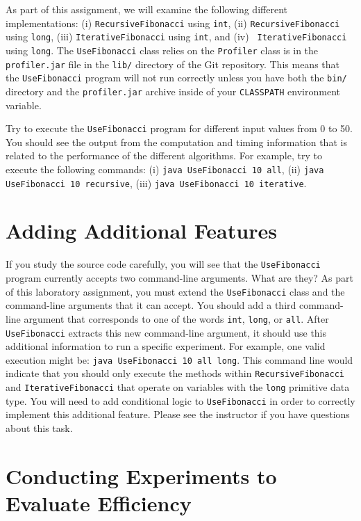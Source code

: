 \begin{sloppypar}
As part of this assignment, we will examine the following different implementations: (i) {\tt RecursiveFibonacci} using
{\tt int}, (ii) {\tt RecursiveFibonacci} using {\tt long}, (iii) {\tt IterativeFibonacci} using {\tt int}, and (iv) {\tt
  IterativeFibonacci} using {\tt long}. The {\tt UseFibonacci} class relies on the {\tt Profiler} class is in the {\tt
  profiler.jar} file in the {\tt lib/} directory of the Git repository.  This means that the {\tt UseFibonacci} program
will not run correctly unless you have both the {\tt bin/} directory and the {\tt profiler.jar} archive inside of your
{\tt CLASSPATH} environment variable.
\end{sloppypar}

Try to execute the {\tt UseFibonacci} program for different input values from 0 to 50. You should see the output from
the computation and timing information that is related to the performance of the different algorithms. For example, try
to execute the following commands: (i) {\tt java UseFibonacci 10 all}, (ii) {\tt java UseFibonacci 10 recursive}, (iii)
{\tt java UseFibonacci 10 iterative}. 

\section*{Adding Additional Features}

If you study the source code carefully, you will see that the {\tt UseFibonacci} program currently accepts two
command-line arguments. What are they? As part of this laboratory assignment, you must extend the {\tt UseFibonacci}
class and the command-line arguments that it can accept. You should add a third command-line argument that corresponds
to one of the words {\tt int}, {\tt long}, or {\tt all}. After {\tt UseFibonacci} extracts this new command-line
argument, it should use this additional information to run a specific experiment. For example, one valid execution might
be: {\tt java UseFibonacci 10 all long}. This command line would indicate that you should only execute the methods
within {\tt RecursiveFibonacci} and {\tt IterativeFibonacci} that operate on variables with the {\tt long} primitive
data type.  You will need to add conditional logic to {\tt UseFibonacci} in order to correctly implement this additional
feature. Please see the instructor if you have questions about this task.

\section*{Conducting Experiments to Evaluate Efficiency}

